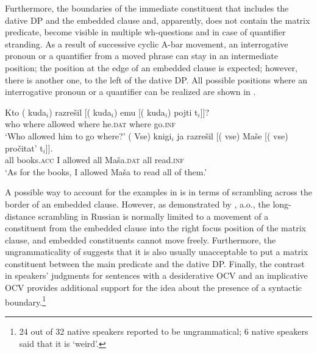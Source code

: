 \documentclass[output=paper,
colorlinks,
citecolor=brown,
newtxmath
]{langscibook}
\begin{document}
Furthermore, the boundaries of the immediate constituent that includes the dative DP and the embedded clause and, apparently, does not contain the matrix predicate, become visible in multiple wh-questions and in case of quantifier stranding. As a result of successive cyclic A-bar movement, an interrogative pronoun or a quantifier from a moved phrase can stay in an intermediate position; the position at the edge of an embedded clause is expected; however, there is another one, to the left of the dative DP. All possible positions where an interrogative pronoun or a quantifier can be realized are shown in .

\begin{exe}
\ex\label{ex7} \begin{xlist}
\ex\label{ex7a} 
\gll Kto (\hspace{-2pt} kuda$_i$) razrešil 	[(\hspace{-2pt} kuda$_i$) emu [(\hspace{-2pt} kuda$_i$) pojti t$_i$]]?\\ 
    who {} where allowed {} where he.\textsc{dat} {} where go.\textsc{inf}\\
\glt `Who allowed him to go where?'
\ex\label{ex7b} 
\gll (\hspace{-2pt} Vse) knigi$_i$ ja razrešil [(\hspace{-2pt} vse) Maše [(\hspace{-2pt} vse) pročitat’ t$_i$]].\\ 
    {} all books.\textsc{acc} I allowed {} all Maša.\textsc{dat} {} all read.\textsc{inf}\\
\glt `As for the books, I allowed Maša to read all of them.'
    \end{xlist}
\end{exe}

\noindent A possible way to account for the examples in  is in terms of scrambling across the border of an embedded clause. However, as demonstrated by \cite{Bailyn2003}, a.o., the long-distance scrambling in Russian is normally limited to a movement of a constituent from the embedded clause into the right focus position of the matrix clause, and embedded constituents cannot move freely. Furthermore, the ungrammaticality of  suggests that it is also usually unacceptable to put a matrix constituent between the main predicate and the dative DP. Finally, the contrast in speakers’ judgments for sentences with a desiderative OCV  and an implicative OCV  provides additional support for the idea about the presence of a syntactic boundary.\footnote{24 out of 32 native speakers reported  to be ungrammatical; 6 native speakers said that it is `weird’.} 
\end{document}

